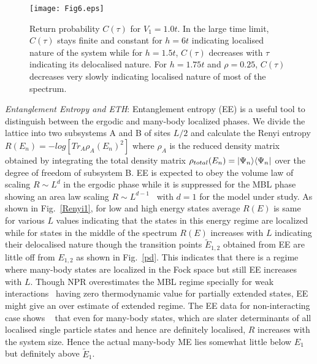 \documentclass[prl,aps,twocolumn,floats,nofootinbib,showpacs]{revtex4}
\begin{document}
\begin{figure}[h!]
\begin{center}
\hskip-0.5cm
\texttt{[image: Fig6.eps]}
\vskip-0.2cm
\caption{Return probability $C(\tau)$ for $V_1=1.0t$. In the large time limit, $C(\tau)$ stays finite and constant for $h=6t$ indicating localised nature of the system while for $h=1.5t$, $C(\tau)$ decreases with $\tau$ indicating its delocalised nature. For $h=1.75t$ and $\rho=0.25$, $C(\tau)$ decreases very slowly indicating localised nature of most of the spectrum.}
\label{ct}
\end{center}
\vskip-0.5cm
\end{figure}

{\it{Entanglement Entropy and ETH}}:
Entanglement entropy (EE) is a useful tool to distinguish between the ergodic and many-body localized phases. We divide the lattice into two subsystems A and B of sites $L/2$ and calculate the Renyi entropy $R(E_n) = -log[Tr_A \rho_A(E_n)^2]$ where $\rho_A$ is the reduced density matrix obtained by integrating the total density matrix $\rho_{total}(E_n) = |\Psi_n\rangle \langle \Psi_n|$ over the degree of freedom of subsystem B.  EE is expected to obey the volume law of scaling $R\sim L^d$ in the ergodic phase while it is suppressed for the MBL phase showing an area law scaling $R\sim L^{d-1}$~\cite{Nayak,Huse2013,Sdsarma} with $d=1$ for the model under study. 
As shown in Fig.~\ref{Renyi1}, for low and high energy states average $R(E)$ is same for various $L$ values indicating that the states in this energy regime are localized while for states in the middle of the spectrum $R(E)$ increases with $L$ indicating their delocalised nature though the transition points $\tilde{E}_{1,2}$ obtained from EE are little off from $E_{1,2}$ as shown in Fig.~\ref{pd}. This indicates that there is a regime where many-body states are localized in the Fock space but still EE increases with $L$. Though NPR overestimates the MBL regime specially for weak interactions~\cite{Sdsarma} having zero thermodynamic value for partially extended states, EE might give an over estimate of extended regime. The EE data for non-interacting case shows ~\cite{supplemental2} that even for many-body states, which are slater determinants of all localised single particle states and  hence are definitely localised, $R$ increases with the system size. Hence the actual many-body ME lies somewhat little below $E_1$ but definitely above $\tilde{E}_1$. 
\end{document}
